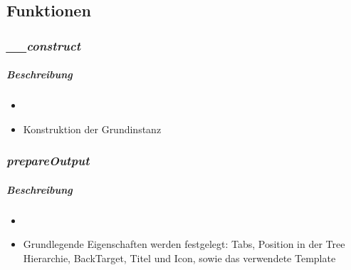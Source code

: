 \paragraph{}
\paragraph{}
\paragraph{}
\paragraph{}
\paragraph{}
\paragraph{}
\paragraph{}
\paragraph{}


\subsection*{Funktionen}

\subsubsection*{\textit{\_\_construct}}\label{constructTGUI}
\subparagraph{Beschreibung}
\begin{itemize}
	\item[] \noindent{}
	\item[] Konstruktion der Grundinstanz
\end{itemize}

\subsubsection*{\textit{prepareOutput}}\label{prepareOutputTGUI}
\subparagraph{Beschreibung}
\begin{itemize}
	\item[] \noindent{}
	\item[] Grundlegende Eigenschaften werden festgelegt: Tabs, Position in der Tree Hierarchie, BackTarget, Titel und Icon, sowie das verwendete Template
\end{itemize}

